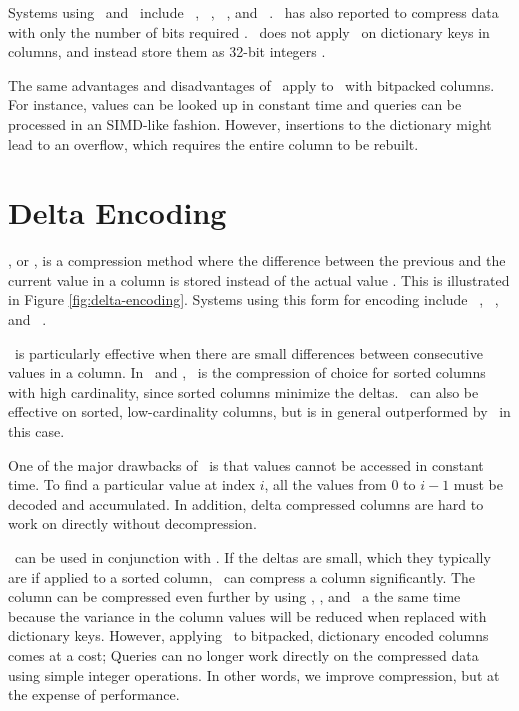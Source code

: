 Systems using \de~and \bp~include \ibm~\cite{Raman2013-em}, \blink~\cite{Barber2012-xt}, \sapnw~\cite{Willhalm2009-hu}, and \saph~\cite{Psaroudakis2014-ma}. \qlikview~has also reported to compress data with only the number of bits required \cite{Qlik2014-vd}. \mssql~does not apply \bp~on dictionary keys in columns, and instead store them as 32-bit integers \cite{Larson2013-mc}.

The same advantages and disadvantages of \bp~apply to \de~with bitpacked columns. For instance, values can be looked up in constant time and queries can be processed in an SIMD-like fashion. However, insertions to the dictionary might lead to an overflow, which requires the entire column to be rebuilt.

\section{Delta Encoding}
\label{sec:Delta Encoding}


\dele, or , is a compression method where the difference between the previous and the current value in a column is stored instead of the actual value \cite{Wikipedia_contributors2015-cb}. This is illustrated in Figure \ref{fig:delta-encoding}.  Systems using this form for encoding include \vertica~\cite{Lamb2012-kg}, \cstore~\cite{Stonebraker2005-qz}, and \blink~\cite{Raman2008-gi}. 

\dele~is particularly effective when there are small differences between consecutive values in a column. In \cstore~and \vertica, \dele~is the compression of choice for sorted columns with high cardinality, since sorted columns minimize the deltas. \dele~can also be effective on sorted, low-cardinality columns, but is in general outperformed by \rle~in this case.

One of the major drawbacks of \dele~is that values cannot be accessed in constant time. To find a particular value at index $i$, all the values from $0$ to $i - 1$ must be decoded and accumulated. In addition, delta compressed columns are hard to work on directly without decompression.

\bp~can be used in conjunction with \dele. If the deltas are small, which they typically are if applied to a sorted column, \bp~can compress a column significantly. The column can be compressed even further by using \de, \dele, and \bp~a the same time because the variance in the column values will be reduced when replaced with dictionary keys. However, applying \dele~to bitpacked, dictionary encoded columns comes at a cost; Queries can no longer work directly on the compressed data using simple integer operations. In other words, we improve compression, but at the expense of performance.

